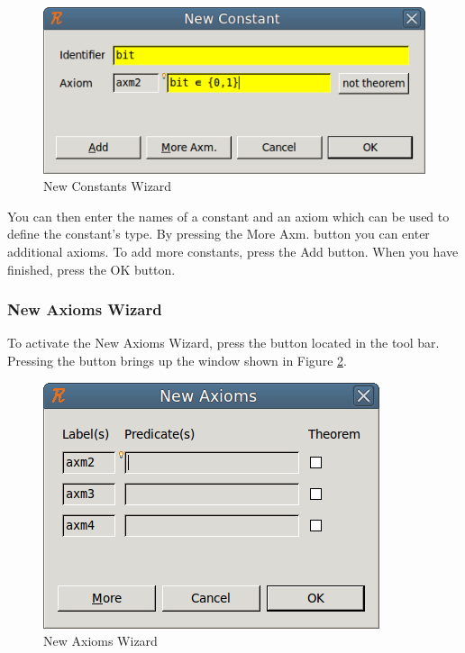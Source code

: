 \begin{figure}[!ht]
\begin{center}
	\includegraphics{img/reference/ref_01_eventb_editor6.png}
	\caption{New Constants Wizard}
	\label{fig_ref_01_eventb_editor6}
\end{center}
\end{figure}

You can then enter the names of a constant and an axiom which can be used to define the constant's type. By pressing the \textsf{More Axm.} button you can enter additional axioms. To add more constants, press the \textsf{Add} button. When you have finished, press the \textsf{OK} button.

\subsubsection{New Axioms Wizard}

To activate the \textsf{New Axioms Wizard}, press the  button located in the tool bar. Pressing the button brings up the window shown in Figure \ref{fig_ref_01_eventb_editor7}.

\begin{figure}[!ht]
\begin{center}
	\includegraphics{img/reference/ref_01_eventb_editor7.png}
	\caption{New Axioms Wizard}
	\label{fig_ref_01_eventb_editor7}
\end{center}
\end{figure}

